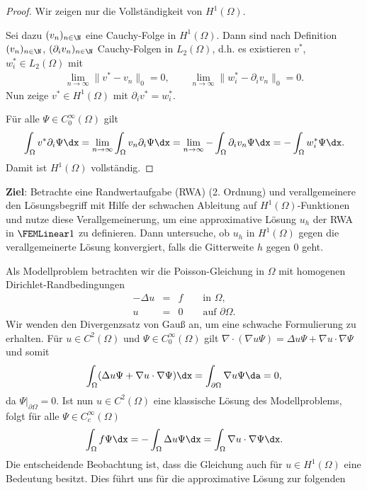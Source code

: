 \begin{proof}
    Wir zeigen nur die Vollständigkeit von $H^1(\Omega)$.

    Sei dazu $(v_n)_{n\in\N}$ eine Cauchy-Folge in $H^1(\Omega)$.
    Dann sind nach Definition $(v_n)_{n\in\N}$, $(\partial_i v_n)_{n\in\N}$ Cauchy-Folgen in
    $L_2(\Omega)$, d.h. es existieren $v^*$, $w_i^* \in L_2(\Omega)$ mit
    \begin{eqnarray*}
        \lim_{n\to\infty} \|v^* - v_n\|_0 = 0, \qquad
        \lim_{n\to\infty} \|w^*_i - \partial_i v_n\|_0 = 0.
    \end{eqnarray*}
    Nun zeige $v^* \in H^1(\Omega)$ mit $\partial_i v^* = w_i^*$.

    Für alle $\Psi \in C_0^\infty(\Omega)$ gilt
    \begin{eqnarray*}
          \int_\Omega v^* \partial_i \Psi \dx
        = \lim_{n\to\infty} \int_\Omega v_n \partial_i \Psi \dx
        = \lim_{n\to\infty} - \int_\Omega \partial_i v_n \Psi \dx
        = - \int_\Omega w_i^* \Psi \dx.
    \end{eqnarray*}
    Damit ist $H^1(\Omega)$ vollständig.
\end{proof}


\textbf{Ziel}:
Betrachte eine Randwertaufgabe (RWA) (2. Ordnung) und verallgemeinere den Lösungsbegriff mit Hilfe der schwachen Ableitung auf $H^1(\Omega)$-Funktionen und nutze diese Verallgemeinerung, um eine approximative Lösung $u_h$ der RWA in $\FEMLinear1$ zu definieren. Dann untersuche, ob $u_h$ in $H^1(\Omega)$ gegen die verallgemeinerte Lösung konvergiert, falls die Gitterweite $h$ gegen $0$ geht.

\begin{Beispiel}
    Als Modellproblem betrachten wir die Poisson-Gleichung in $\Omega$ mit homogenen Dirichlet-Randbedingungen
    \begin{eqnarray*}
        -\Delta u &=& f \qquad \text{in } \Omega, \\
        u &=& 0 \qquad \text{auf } \partial \Omega.
    \end{eqnarray*}
    Wir wenden den Divergenzsatz von Gauß an, um eine schwache Formulierung zu erhalten. Für $u \in C^2(\Omega)$ und $\Psi \in C_0^\infty(\Omega)$ gilt $\nabla \cdot (\nabla u \Psi) = \Delta u \Psi + \nabla u \cdot \nabla \Psi$ und somit
    \begin{eqnarray*}
            \int_\Omega (\Delta u \Psi + \nabla u \cdot \nabla \Psi) \dx
        =   \int_{\partial \Omega} \nabla u \Psi \da = 0,
    \end{eqnarray*}
    da $\Psi|_{\partial \Omega} = 0$. Ist nun $u \in C^2(\Omega)$ eine klassische Lösung des Modellproblems, folgt für alle $\Psi \in C_c^\infty(\Omega)$
    \begin{eqnarray*}
        \int_\Omega f \Psi \dx = - \int_\Omega \Delta u \Psi \dx = \int_\Omega \nabla u \cdot \nabla \Psi \dx.
    \end{eqnarray*}
    Die entscheidende Beobachtung ist, dass die Gleichung auch für $u \in H^1(\Omega)$ eine Bedeutung besitzt. Dies führt uns für die approximative Lösung zur folgenden
\end{Beispiel}


